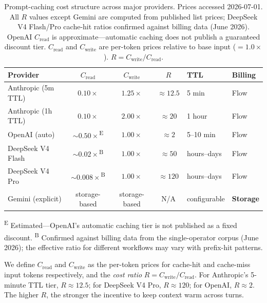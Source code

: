 \documentclass[11pt]{article}
\theoremstyle{definition}
\theoremstyle{remark}
\begin{document}
\begin{table}[ht]
\centering
\caption{Prompt-caching cost structure across major providers. Prices accessed 2026-07-01. All $R$ values except Gemini are computed from published list prices; DeepSeek V4 Flash/Pro cache-hit ratios confirmed against billing data (June 2026). OpenAI $C_{\text{read}}$ is approximate---automatic caching does not publish a guaranteed discount tier. $C_{\text{read}}$ and $C_{\text{write}}$ are per-token prices relative to base input ($=1.0\times$). $R = C_{\text{write}} / C_{\text{read}}$.}
\label{tab:providers}
\small
\begin{tabular}{l c c c l l}
\toprule
Provider & $C_{\text{read}}$ & $C_{\text{write}}$ & $R$ & TTL & Billing \\
\midrule
Anthropic (5m TTL) & $0.10\times$ & $1.25\times$ & $\approx 12.5$ & 5 min & Flow \\
Anthropic (1h TTL) & $0.10\times$ & $2.00\times$ & $\approx 20$ & 1 hour & Flow \\
OpenAI (auto) & $\sim$$0.50\times$\textsuperscript{E} & $1.00\times$ & $\approx 2$ & 5--10 min & Flow \\
DeepSeek V4 Flash & $\sim$$0.02\times$\textsuperscript{B} & $1.00\times$ & $\approx 50$ & hours--days & Flow \\
DeepSeek V4 Pro & $\sim$$0.008\times$\textsuperscript{B} & $1.00\times$ & $\approx 120$ & hours--days & Flow \\
Gemini (explicit) & storage-based & storage-based & N/A & configurable & \textbf{Storage} \\
\bottomrule
\end{tabular}

\raggedright\footnotesize
\textsuperscript{E} Estimated---OpenAI's automatic caching tier is not published as a fixed discount. \textsuperscript{B} Confirmed against billing data from the single-operator corpus (June 2026); the effective ratio for different workflows may vary with prefix-hit patterns.

\end{table}

We define $C_{\text{read}}$ and $C_{\text{write}}$ as the per-token prices for cache-hit and cache-miss input tokens respectively, and the \emph{cost ratio} $R = C_{\text{write}} / C_{\text{read}}$. For Anthropic's 5-minute TTL tier, $R \approx 12.5$; for DeepSeek V4 Pro, $R \approx 120$; for OpenAI, $R \approx 2$. The higher $R$, the stronger the incentive to keep context warm across turns.
\end{document}
